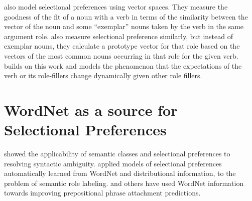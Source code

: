 \cite{erk2010flexible} also model selectional preferences using vector spaces.  
They measure the 
goodness of the fit of a noun with a verb in terms of the similarity between the 
vector of the noun and 
some ``exemplar'' nouns taken by the verb in the same argument role.  
\cite{baroni2010distributional} 
also measure selectional preference similarly, but instead of exemplar nouns, 
they calculate a 
prototype vector for that role based on the vectors of the most common nouns 
occurring in that 
role for the given verb.  \cite{lenci2011composing} builds on this work and 
models the phenomenon
that the expectations of the verb or its role-fillers change dynamically given 
other role fillers.

\section{WordNet as a source for Selectional Preferences}
\cite{resnik:93} showed the applicability of semantic classes and selectional preferences to resolving syntactic ambiguity. \cite{Zapirain2013SelectionalPF} applied models of selectional preferences automatically learned from WordNet and distributional information, to the problem of semantic role labeling. \cite{resnik:93,brill1994rule,agirre2008improving} and others have used WordNet information towards improving prepositional phrase attachment predictions.

